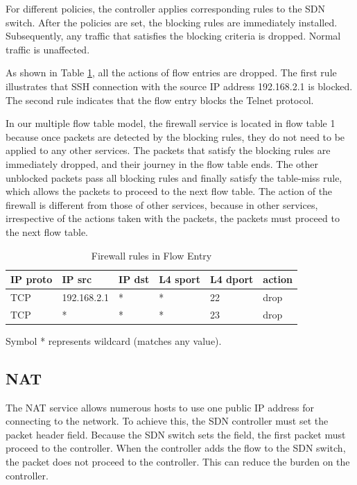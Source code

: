 \documentclass[journal]{IEEEtran}
\begin{document}
For different policies, the controller applies corresponding rules to the SDN switch. After the policies are set, the blocking rules are immediately installed. Subsequently, any traffic that satisfies the blocking criteria is dropped. Normal traffic is unaffected.

As shown in Table \ref{table:fw}, all the actions of flow entries are dropped. The first rule illustrates that SSH connection with the source IP address 192.168.2.1 is blocked. The second rule indicates that the flow entry blocks the Telnet protocol.

In our multiple flow table model, the firewall service is located in flow table 1 because once packets are detected by the blocking rules, they do not need to be applied to any other services. The packets that satisfy the blocking rules are immediately dropped, and their journey in the flow table ends. The other unblocked packets pass all blocking rules and finally satisfy the table-miss rule, which allows the packets to proceed to the next flow table. The action of the firewall is different from those of other services, because in other services, irrespective of the actions taken with the packets, the packets must proceed to the next flow table.

\begin{table}[!t]
\caption{Firewall rules in Flow Entry}
\label{table:fw}
\centering
\begin{threeparttable}
\begin{tabular}{|l|l|l|l|l|l|}
\hline
IP proto & IP src      & IP dst       & L4 sport & L4 dport & action \\ \hline
TCP      & 192.168.2.1 & *            & *        & 22       & drop   \\ \hline
TCP      & *           & *            & *        & 23       & drop   \\ \hline
\end{tabular}
  \begin{tablenotes}
    \item[] Symbol * represents wildcard (matches any value).
  \end{tablenotes}
\end{threeparttable}
\end{table}



\subsection{NAT}
The NAT service allows numerous hosts to use one public IP address for connecting to the network. To achieve this, the SDN controller must set the packet header field. Because the SDN switch sets the field, the first packet must proceed to the controller. When the controller adds the flow to the SDN switch, the packet does not proceed to the controller. This can reduce the burden on the controller.
\end{document}
